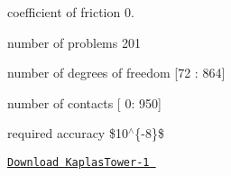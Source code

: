 


\begin{DoxyItemize}
\item coefficient of friction 0. 
\item number of problems 201  
\item number of degrees of freedom \mbox{[}72 \+: 864\mbox{]}  
\item number of contacts \mbox{[} 0\+: 950\mbox{]} 
\item required accuracy \$10$^\wedge$\{-\/8\}\$ 
\end{DoxyItemize}

\href{./resources/KaplasTower-1.tar.gz}{\tt Download Kaplas\+Tower-\/1 } 